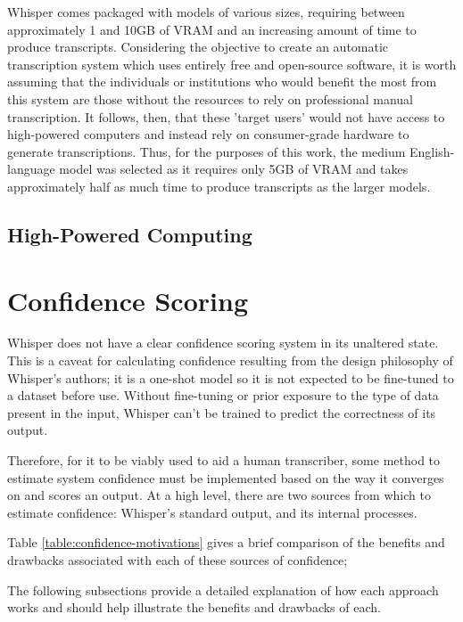 Whisper comes packaged with models of various sizes, requiring between approximately 1 and 10GB of VRAM and an increasing amount of time to produce transcripts.
Considering the objective to create an automatic transcription system which uses entirely free and open-source software, it is worth assuming that the individuals or institutions who would benefit the most from this system are those without the resources to rely on professional manual transcription.
It follows, then, that these 'target users' would not have access to high-powered computers and instead rely on consumer-grade hardware to generate transcriptions.
Thus, for the purposes of this work, the medium English-language model was selected as it requires only 5GB of VRAM and takes approximately half as much time to produce transcripts as the larger models\cite{whisper}.

\subsection{High-Powered Computing}

\section{Confidence Scoring}\label{sec:confidence-scoring}

Whisper does not have a clear confidence scoring system in its unaltered state.
This is a caveat for calculating confidence resulting from the design philosophy of Whisper's authors; it is a one-shot model so it is not expected to be fine-tuned to a dataset before use.
Without fine-tuning or prior exposure to the type of data present in the input, Whisper can't be trained to predict the correctness of its output.

Therefore, for it to be viably used to aid a human transcriber, some method to estimate system confidence must be implemented based on the way it converges on and scores an output.
At a high level, there are two sources from which to estimate confidence: Whisper's standard output, and its internal processes.

Table \ref{table:confidence-motivations} gives a brief comparison of the benefits and drawbacks associated with each of these sources of confidence;



The following subsections provide a detailed explanation of how each approach works and should help illustrate the benefits and drawbacks of each.

